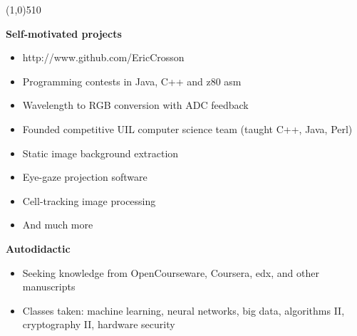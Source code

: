 \documentclass{report}
\newcommand{\cut}{\begin{center} \line(1,0){510} \end{center}}
\begin{document}
\cut{}

\textbf{Self-motivated projects}
\begin{paracol}{2}

  \begin{itemize}[label=$\circ$]
  \item http://www.github.com/EricCrosson
  \item Programming contests in Java, C++ and z80 asm
  \item Wavelength to RGB conversion with ADC feedback
  \item Founded competitive UIL computer science team (taught C++, Java, Perl)
  \end{itemize}

  \switchcolumn{}
  \begin{itemize}[label=$\circ$]
  \item Static image background extraction
  \item Eye-gaze projection software
  \item Cell-tracking image processing
  \item And much more
  \end{itemize}
\end{paracol}

\textbf{Autodidactic}
\begin{itemize}[label=$\circ$]
\item Seeking knowledge from OpenCourseware, Coursera, edx, and other manuscripts
\item Classes taken: machine learning, neural networks, big data, algorithms II,
  cryptography II, hardware security
\end{itemize}


\end{document}
